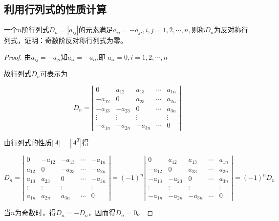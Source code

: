 \subsection{利用行列式的性质计算}

\begin{example}
    一个$n$阶行列式$D_{n}=\left |a_{ij} \right |$的元素满足$a_{ij}=-a_{ji},i,j=1,2,\cdots,n,$则称$D_{n}$为反对称行列式，证明：奇数阶反对称行列式为零。
\end{example}

\begin{proof}
    由$a_{ij}=-a_{ji}$知$a_{ii}=-a_{ii}$,即
$a_{ii}=0,i=1,2,\cdots,n$

故行列式$D_{n}$可表示为


$$D_{n}= \left|\begin{array}{cccccc}
        0       & a_{12}  & a_{13}  & \cdots & a_{1n} \\
        -a_{12} & 0       & a_{23}  & \cdots & a_{2n} \\
        -a_{13} & -a_{23} & 0       & \cdots & a_{3n} \\
        \vdots  & \vdots  & \vdots  &        & \vdots \\
        -a_{1n} & -a_{2n} & -a_{3n} & \cdots & 0
    \end{array}\right|$$

由行列式的性质$\left | A \right |=\left | A^{T} \right |$得

$$D_{n}= \left|\begin{array}{cccccc}
        0      & -a_{12} & -a_{13} & \cdots & -a_{1n} \\
        a_{12} & 0       & -a_{23} & \cdots & -a_{2n} \\
        a_{13} & a_{23}  & 0       & \cdots & -a_{3n} \\
        \vdots & \vdots  & \vdots  &        & \vdots  \\
        a_{1n} & a_{2n}  & a_{3n}  & \cdots & 0
    \end{array}\right|=(-1)^{n}
    \left|\begin{array}{cccccc}
        0       & a_{12}  & a_{13}  & \cdots & a_{1n} \\
        -a_{12} & 0       & a_{23}  & \cdots & a_{2n} \\
        -a_{13} & -a_{23} & 0       & \cdots & a_{3n} \\
        \vdots  & \vdots  & \vdots  &        & \vdots \\
        -a_{1n} & -a_{2n} & -a_{3n} & \cdots & 0
    \end{array}\right|=(-1)^{n}D_{n}
$$

当$n$为奇数时，得$D_{n}=-D_{n}$，因而得$D_{n}=0$。
\end{proof}

